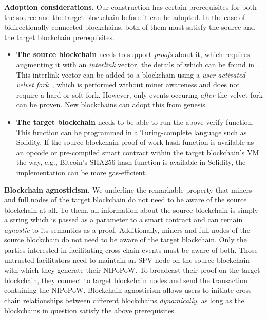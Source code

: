 \noindent
\textbf{Adoption considerations. } Our construction has certain prerequisites
for both the source and the target blockchain before it can be adopted. In the
case of bidirectionally connected blockchains, both of them must satisfy the
source and the target blockchain prerequisites.

\begin{itemize}
  \item \textbf{The source blockchain} needs to support \emph{proofs} about it,
        which requires augmenting it with an \emph{interlink} vector, the
        details of which can be found in~\cite{popow}. This interlink vector
        can be added to a blockchain using a \emph{user-activated velvet
        fork}~\cite{nipopows,velvet}, which is performed without miner awareness
        and does not require a hard or soft fork. However, only events occuring
        \emph{after} the velvet fork can be proven. New blockchains can adopt
        this from genesis.
  \item \textbf{The target blockchain} needs to be able to run the above
        \textsf{verify} function. This function can be programmed in a
        Turing-complete language such as Solidity. If the source blockchain
        proof-of-work hash function is available as an opcode or pre-compiled
        smart contract within the target blockchain's VM the way, e.g.,
        Bitcoin's SHA256 hash function is available in Solidity, the
        implementation can be more gas-efficient.
\end{itemize}

\noindent
\textbf{Blockchain agnosticism. }
We underline the remarkable property that miners and full nodes of the target
blockchain do not need to be aware of the source blockchain at all. To them,
all information about the source blockchain is simply a string which is passed
as a parameter to a smart contract and can remain \emph{agnostic} to its
semantics as a proof. Additionally, miners and full nodes of the source
blockchain do not need to be aware of the target blockchain. Only the parties
interested in facilitating cross-chain events must be aware of both. Those
untrusted facilitators need to maintain an SPV node on the source blockchain
with which they generate their NIPoPoW. To broadcast their proof on the target
blockchain, they connect to target blockchain nodes and send the transaction
containing the NIPoPoW. Blockchain agnosticism allows users to initiate
cross-chain relationships between different blockchains \emph{dynamically}, as
long as the blockchains in question satisfy the above prerequisites.

